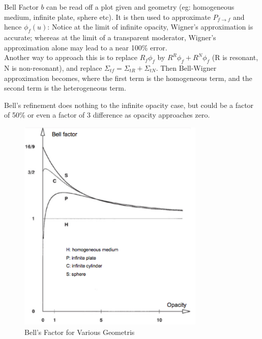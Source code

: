 \documentclass{school-22.211-notes}
\begin{document}
\clearpage
{}
Bell Factor $b$ can be read off a plot given  and geometry (eg: homogeneous medium, infinite plate, sphere etc). It is then used to approximate $P_{f\to f}$ and hence $\phi_f(u)$:
Notice at the limit of infinite opacity, Wigner's approximation is accurate; whereas at the limit of a transparent moderator, Wigner's approximation alone may lead to a near 100\% error.\\
Another way to approach this is to replace $R_f \phi_f$ by $R^R \phi_f + R^N \phi_f$ (R is resonant, N is non-resonant), and replace $\Sigma_{tf} = \Sigma_{tR} + \Sigma_{tN}$. Then 
Bell-Wigner approximation becomes, where the first term is the homogeneous term, and the second term is the heterogeneous term. 

Bell's refinement does nothing to the infinite opacity case, but could be a factor of 50\% or even a factor of 3 difference as opacity approaches zero. 
\begin{figure}[ht]
  \centering
  \includegraphics[width=3.5in]{images/r-m/bell.png}
  \caption{Bell's Factor for Various Geometris} \label{bell}
\end{figure}
\end{document}
